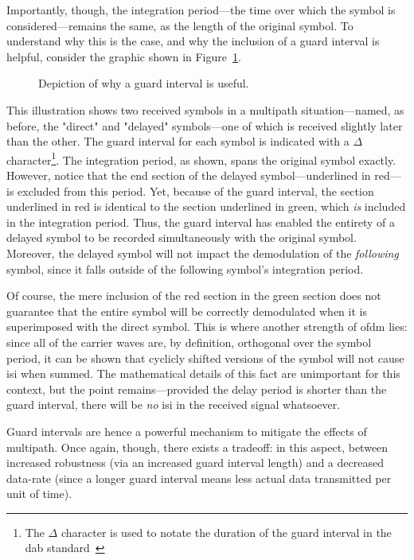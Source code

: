 \documentclass[class=report,11pt,crop=false]{standalone}
\begin{document}
Importantly, though, the integration period---the time over which the symbol is considered---remains the same, as the length of the original symbol. To understand why this is the case, and why the inclusion of a guard interval is helpful, consider the graphic shown in Figure~\ref{fig:guard-intervals-demo}.
\begin{figure}[htbp]
    \centering
    \captionsetup{type=figure}
    \def\svgwidth{1\linewidth}
    { %
        }
    \caption{Depiction of why a guard interval is useful.}
    \label{fig:guard-intervals-demo}
\end{figure}
This illustration shows two received symbols in a multipath situation---named, as before, the "direct" and "delayed" symbols---one of which is received slightly later than the other. The guard interval for each symbol is indicated with a \(\Delta\) character\footnote{The \(\Delta\) character is used to notate the duration of the guard interval in the \gls{dab} standard~\cite{dabstandard}}. The integration period, as shown, spans the original symbol exactly. However, notice that the end section of the delayed symbol---underlined in red---is excluded from this period. Yet, because of the guard interval, the section underlined in red is identical to the section underlined in green, which \emph{is} included in the integration period. Thus, the guard interval has enabled the entirety of a delayed symbol to be recorded simultaneously with the original symbol. Moreover, the delayed symbol will not impact the demodulation of the \emph{following} symbol, since it falls outside of the following symbol's integration period.

Of course, the mere inclusion of the red section in the green section does not guarantee that the entire symbol will be correctly demodulated when it is superimposed with the direct symbol. This is where another strength of \gls{ofdm} lies: since all of the carrier waves are, by definition, orthogonal over the symbol period, it can be shown that cyclicly shifted versions of the symbol will not cause \gls{isi} when summed. The mathematical details of this fact are unimportant for this context, but the point remains---provided the delay period is shorter than the guard interval, there will be \emph{no} \gls{isi} in the received signal whatsoever.

Guard intervals are hence a powerful mechanism to mitigate the effects of multipath. Once again, though, there exists a tradeoff: in this aspect, between increased robustness (via an increased guard interval length) and a decreased data-rate (since a longer guard interval means less actual data transmitted per unit of time).
\end{document}
